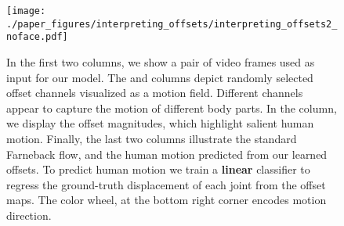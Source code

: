 \documentclass{article}
\begin{document}
\begin{figure}
\begin{center}
   \texttt{[image: ./paper\_figures/interpreting\_offsets/interpreting\_offsets2\_noface.pdf]}
\end{center}
\vspace{-0.1cm}
\caption{In the first two columns, we show a pair of video frames used as input for our model. The  and  columns depict  randomly selected offset channels visualized as a motion field. Different channels appear to capture the motion of different body parts. In the  column, we display the offset magnitudes, which highlight salient human motion. Finally, the last two columns illustrate the standard Farneback flow, and the human motion predicted from our learned offsets. To predict human motion we train a \textbf{linear} classifier to regress the ground-truth  displacement of each joint from the offset maps. The color wheel, at the bottom right corner encodes motion direction.\vspace{-0.1cm}}
\label{offsets_fig}
\end{figure}































\small





\end{document}
